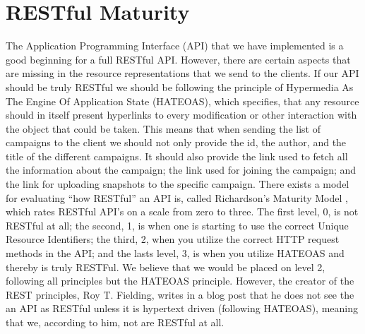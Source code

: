 
\section{RESTful Maturity}
\label{sec:restful_maturity}

The Application Programming Interface (API) that we have implemented is a good beginning for a full RESTful API. However, there are certain aspects that are missing in the resource representations that we send to the clients. If our API should be truly RESTful we should be following the principle of Hypermedia As The Engine Of Application State (HATEOAS), which specifies, that any resource should in itself present hyperlinks to every modification or other interaction with the object that could be taken. This means that when sending the list of campaigns to the client we should not only provide the id, the author, and the title of the different campaigns. It should also provide the link used to fetch all the information about the campaign; the link used for joining the campaign; and the link for uploading snapshots to the specific campaign. There exists a model for evaluating ``how RESTful'' an API is, called Richardson's Maturity Model \parencite{richardsons_model}, which rates RESTful API's on a scale from zero to three. The first level, 0, is not RESTful at all; the second, 1, is when one is starting to use the correct Unique
Resource Identifiers; the third, 2, when you utilize the correct HTTP request methods in the API; and the lasts level, 3, is when you utilize HATEOAS and thereby is truly RESTFul. We believe that we would be placed on level 2, following all principles but the HATEOAS principle. However, the creator of the REST principles, Roy T. Fielding, writes in a blog post that he does not see the an API as RESTful unless it is hypertext driven (following HATEOAS)\parencite{http_manden_blog}, meaning that we, according to him, not are RESTful at all. 